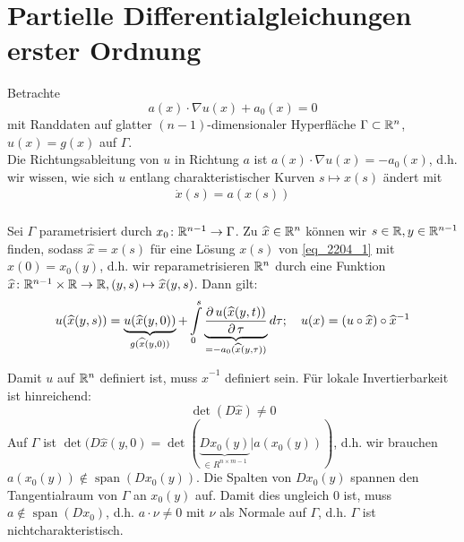 \section{Partielle Differentialgleichungen erster Ordnung}
\label{sec:para3}

	Betrachte 
	\[ a(x) \cdot \nabla u(x) + a_0(x) = 0 \] mit Randdaten auf glatter $(n-1)$-dimensionaler Hyperfläche $\Gamma \subset \mathbb{R}^n$, $u(x) = g(x)$ auf $\Gamma$. \\
	Die Richtungsableitung von $u$ in Richtung $a$ ist $a(x) \cdot \nabla u(x) = -a_0 (x)$, d.h. wir wissen, wie sich $u$ entlang charakteristischer Kurven $s \mapsto x(s)$ ändert mit
	\begin{equation}
	\begin{aligned}
		\dot{x}(s) = a(x(s)) \label{eq_2204_1}
	\end{aligned}
	\end{equation} \\
	Sei $\Gamma$ parametrisiert durch $x_0 \colon \mathbb{R}^{n-1} \rightarrow \Gamma$. Zu $\widehat{x} \in \mathbb{R}^n$ können wir $s \in \mathbb{R}, y \in \mathbb{R}^{n-1}$ finden, sodass $\widehat{x} = x(s)$ für eine Lösung $x(s)$ von \eqref{eq_2204_1} mit $x(0) = x_0(y)$, d.h. wir reparametrisieren $\mathbb{R}^n$ durch eine Funktion $\widehat{x}\colon \mathbb{R}^{n-1} \times \mathbb{R} \rightarrow \mathbb{R}, (y,s) \mapsto \widehat{x}(y,s)$. Dann gilt:
	\[ u(\widehat{x}(y,s)) = \underbrace{u(\widehat{x}(y,0))}_{g(\widehat{x}(y,0))} + \int\limits_{0}^{s} \underbrace{\frac{\operatorname{\partial} u(\widehat{x}(y,t))}{\operatorname{\partial} \tau}}_{=-a_0(\widehat{x}(y,\tau))} d\tau; \quad u(x) = (u \circ \widehat{x}) \circ \widehat{x}^{-1} \]
	
\begin{bem} \label{bem_2}
	Damit $u$ auf $\mathbb{R}^n$ definiert ist, muss $\widehat{x}^{-1}$ definiert sein.\marginnote{[2]} Für lokale Invertierbarkeit ist hinreichend:
	\[ \det(D \widehat{x}) \neq 0 \]
	Auf $\Gamma$ ist $\det(D \widehat{x}(y,0) = \det( \underbrace{D x_0(y)}_{\in R^{n\times m -1}}\vert a(x_0(y)))$, d.h. wir brauchen $a(x_0(y)) \notin \operatorname{span}(Dx_0(y))$. Die Spalten von $Dx_0(y)$ spannen den Tangentialraum von $\Gamma$ an $x_0(y)$ auf. Damit dies ungleich 0 ist, muss $a \notin \operatorname{span}(Dx_0)$, d.h. $a \cdot \nu \neq 0$ mit $\nu$ als Normale auf $\Gamma$, d.h. $\Gamma$ ist nichtcharakteristisch.
\end{bem}
	
